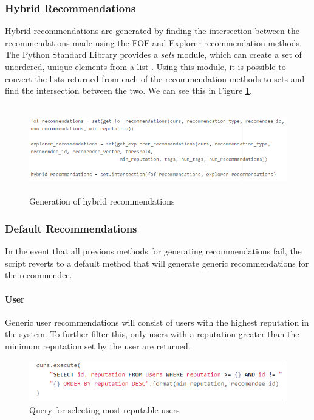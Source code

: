 \subsubsection{Hybrid Recommendations}
Hybrid recommendations are generated by finding the intersection between the recommendations made using the FOF and Explorer recommendation methods. The Python Standard Library provides a \textit{sets} module, which can create a set of unordered, unique elements from a list \cite{Python:Sets}. Using this module, it is possible to convert the lists returned from each of the recommendation methods to sets and find the intersection between the two. We can see this in Figure \ref{fig:HybridRecommendations}.

\begin{figure}[H]
\centering
\includegraphics[height=1.5in]{Images/Implementation/HybridRecommendations}
\caption{Generation of hybrid recommendations}
\label{fig:HybridRecommendations}
\end{figure}

\subsubsection{Default Recommendations}
In the event that all previous methods for generating recommendations fail, the script reverts to a default method that will generate generic recommendations for the recommendee. 

\paragraph{User} Generic user recommendations will consist of users with the highest reputation in the system. To further filter this, only users with a reputation greater than the minimum reputation set by the user are returned.

\begin{figure}[H]
\centering
\includegraphics[height=0.7in]{Images/Implementation/DefaultUsers}
\caption{Query for selecting most reputable users}
\label{fig:DefaultUsers}
\end{figure}

